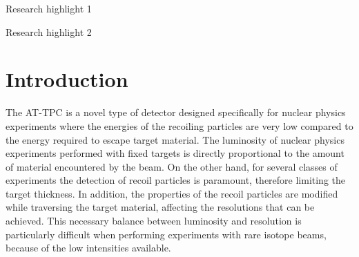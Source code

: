 \documentclass[review,number,sort&compress]{elsarticle}
\begin{document}
\begin{frontmatter}
\begin{abstract}
\end{abstract}

\begin{graphicalabstract}
\end{graphicalabstract}

\begin{highlights}
\item Research highlight 1
\item Research highlight 2
\end{highlights}

\begin{keyword}



\end{keyword}

\end{frontmatter}

\section{Introduction}\label{sec:intro}

%
%   

The AT-TPC \cite{Bradt2017} is a novel type of detector designed specifically for nuclear physics experiments where the energies of the recoiling particles are very low compared to the energy required to escape target material. The luminosity of nuclear physics experiments performed with fixed targets is directly proportional to the amount of material encountered by the beam. On the other hand, for several classes of experiments the detection of recoil particles is paramount, therefore limiting the target thickness. In addition, the properties of the recoil particles are modified while traversing the target material, affecting the resolutions that can be achieved. This necessary balance between luminosity and resolution is particularly difficult when performing experiments with rare isotope beams, because of the low intensities available. 
\end{document}
